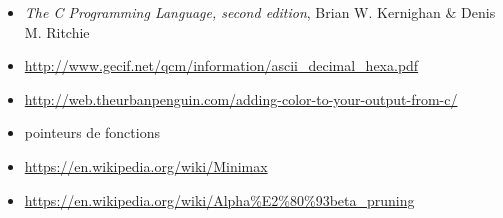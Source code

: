 \documentclass[12pt,L,fira-sans]{paper}
\begin{document}
\begin{itemize}
    \item \emph{The C Programming Language, second edition}, Brian W. Kernighan \& Denis M. Ritchie
    \item \url{http://www.gecif.net/qcm/information/ascii_decimal_hexa.pdf}
    \item \url{http://web.theurbanpenguin.com/adding-color-to-your-output-from-c/}
    \item pointeurs de fonctions
    \item \url{https://en.wikipedia.org/wiki/Minimax}
    \item \url{https://en.wikipedia.org/wiki/Alpha%E2%80%93beta_pruning}
\end{itemize}
\end{document}
